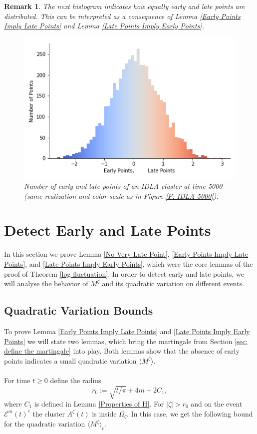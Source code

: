 \documentclass[11pt]{article}
\numberwithin{equation}{section}
\def\OZ{\Omega_{\zeta}}
\newtheorem*{remark}{Remark}
\begin{document}
\begin{remark}
  The next histogram indicates 
  how equally early and late points are 
  distributed. This can be interpreted as 
  a consequence of Lemma \ref{Early Points Imply Late Points} 
  and Lemma \ref{Late Points Imply Early Points}.
  \begin{figure}[H]
    \centering
    \captionsetup{width=.85\linewidth}
    \includegraphics[width=.9\linewidth]{histo5001.png}
    \caption{Number of early and late points of an 
      IDLA cluster at time 5000 
      (same realization and color scale as in 
      Figure \ref{F: IDLA 5000}).}
    \label{F: histo IDLA 5000}
  \end{figure}
\end{remark}

\section{Detect Early and Late Points} 
\label{sec: detect early and late points}
In this section we prove Lemma \ref{No Very Late Point},
\ref{Early Points Imply Late Points}, and 
\ref{Late Points Imply Early Points}, 
which were the core lemmas of the 
proof of Theorem \ref{log fluctuation}.
In order to detect early and late points, we will analyse 
the behavior of $M^{\zeta}$ and its quadratic variation 
on different events.
  

\subsection{Quadratic Variation Bounds}
\label{sec: QV Bounds}
To prove Lemma \ref{Early Points Imply Late Points} 
and \ref{Late Points Imply Early Points} 
we will state two lemmas, which 
bring the martingale from Section \ref{sec: define the martingale} into play. 
Both lemmas show that the absence of early points 
indicates a small quadratic variation $\langle M^{\zeta} \rangle$.\\~\\
For time $t \geq 0$ define the radius
\begin{equation}\label{D: r_0}
  r_0 :=  \sqrt{t/\pi}+4m+2C_1,
\end{equation}
where $C_1$ is defined in Lemma \ref{Properties of H}.
For $|\zeta| > r_0$ and on the event $\mathcal{E}^m(t)^c$ 
the cluster $A^{\zeta}(t)$ is inside $\OZ$. 
In this case, we get the following bound for 
the quadratic variation $ \langle M^{\zeta} \rangle _t$.
\end{document}
